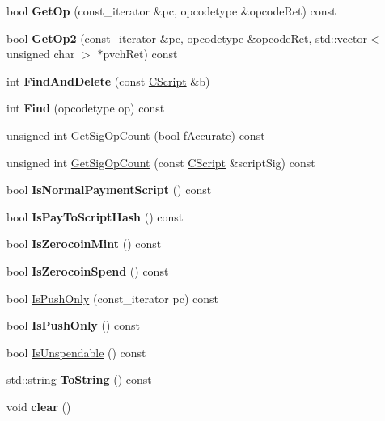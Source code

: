 \begin{DoxyCompactItemize}
\item 
\mbox{\label{class_c_script_aa292083a7d467b4991fd650fa42e333d}} 
bool {\bfseries Get\+Op} (const\+\_\+iterator \&pc, opcodetype \&opcode\+Ret) const
\item 
\mbox{\label{class_c_script_aac2dbe75742054049b0c6de0e9473ef0}} 
bool {\bfseries Get\+Op2} (const\+\_\+iterator \&pc, opcodetype \&opcode\+Ret, std\+::vector$<$ unsigned char $>$ $\ast$pvch\+Ret) const
\item 
\mbox{\label{class_c_script_aad6e9f84fe8aa2d27a979f1bc2732463}} 
int {\bfseries Find\+And\+Delete} (const \mbox{\hyperlink{class_c_script}{C\+Script}} \&b)
\item 
\mbox{\label{class_c_script_a89876c711ef226abd65088672cef6c2d}} 
int {\bfseries Find} (opcodetype op) const
\item 
unsigned int \mbox{\hyperlink{class_c_script_a957f92ddf3efcd76b66e514c05f27dde}{Get\+Sig\+Op\+Count}} (bool f\+Accurate) const
\item 
unsigned int \mbox{\hyperlink{class_c_script_ab2fc38465955bb6688d204036633ee85}{Get\+Sig\+Op\+Count}} (const \mbox{\hyperlink{class_c_script}{C\+Script}} \&script\+Sig) const
\item 
\mbox{\label{class_c_script_a4bebedf75cc256220cd7be25a6c95fe7}} 
bool {\bfseries Is\+Normal\+Payment\+Script} () const
\item 
\mbox{\label{class_c_script_a0c3729c606d318923dc06f95d85a0971}} 
bool {\bfseries Is\+Pay\+To\+Script\+Hash} () const
\item 
\mbox{\label{class_c_script_aadeaf93bd9c00abc9e20d082051adac8}} 
bool {\bfseries Is\+Zerocoin\+Mint} () const
\item 
\mbox{\label{class_c_script_a84914a83542deece42dda7b22b043c1f}} 
bool {\bfseries Is\+Zerocoin\+Spend} () const
\item 
bool \mbox{\hyperlink{class_c_script_a090905f875fa5a40e616b319de8e973f}{Is\+Push\+Only}} (const\+\_\+iterator pc) const
\item 
\mbox{\label{class_c_script_a804771eeafb1039672515eabbc823274}} 
bool {\bfseries Is\+Push\+Only} () const
\item 
bool \mbox{\hyperlink{class_c_script_a11c26ad1d03fa2d60a733337c21b6719}{Is\+Unspendable}} () const
\item 
\mbox{\label{class_c_script_a05fe53ab8fc6a217036bb0d6d7f5d706}} 
std\+::string {\bfseries To\+String} () const
\item 
\mbox{\label{class_c_script_a7b2baf842621f07c4939408acf63377c}} 
void {\bfseries clear} ()
\end{DoxyCompactItemize}
